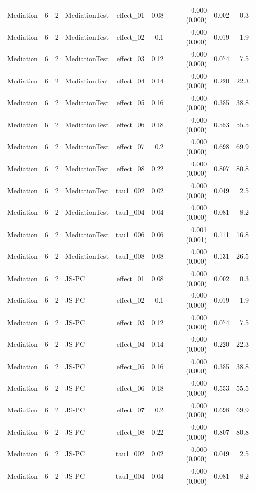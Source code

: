 \begin{longtable}{lcclrrrrr}
Mediation & 6 & 2 & MediationTest & effect\_01 & 0.08 & 0.000 (0.000) & 0.002 & 0.3\\
Mediation & 6 & 2 & MediationTest & effect\_02 & 0.1 & 0.000 (0.000) & 0.019 & 1.9\\
Mediation & 6 & 2 & MediationTest & effect\_03 & 0.12 & 0.000 (0.000) & 0.074 & 7.5\\
Mediation & 6 & 2 & MediationTest & effect\_04 & 0.14 & 0.000 (0.000) & 0.220 & 22.3\\
Mediation & 6 & 2 & MediationTest & effect\_05 & 0.16 & 0.000 (0.000) & 0.385 & 38.8\\
Mediation & 6 & 2 & MediationTest & effect\_06 & 0.18 & 0.000 (0.000) & 0.553 & 55.5\\
Mediation & 6 & 2 & MediationTest & effect\_07 & 0.2 & 0.000 (0.000) & 0.698 & 69.9\\
Mediation & 6 & 2 & MediationTest & effect\_08 & 0.22 & 0.000 (0.000) & 0.807 & 80.8\\
Mediation & 6 & 2 & MediationTest & tau1\_002 & 0.02 & 0.000 (0.000) & 0.049 & 2.5\\
Mediation & 6 & 2 & MediationTest & tau1\_004 & 0.04 & 0.000 (0.000) & 0.081 & 8.2\\
Mediation & 6 & 2 & MediationTest & tau1\_006 & 0.06 & 0.001 (0.001) & 0.111 & 16.8\\
Mediation & 6 & 2 & MediationTest & tau1\_008 & 0.08 & 0.000 (0.000) & 0.131 & 26.5\\
Mediation & 6 & 2 & JS-PC & effect\_01 & 0.08 & 0.000 (0.000) & 0.002 & 0.3\\
Mediation & 6 & 2 & JS-PC & effect\_02 & 0.1 & 0.000 (0.000) & 0.019 & 1.9\\
Mediation & 6 & 2 & JS-PC & effect\_03 & 0.12 & 0.000 (0.000) & 0.074 & 7.5\\
Mediation & 6 & 2 & JS-PC & effect\_04 & 0.14 & 0.000 (0.000) & 0.220 & 22.3\\
Mediation & 6 & 2 & JS-PC & effect\_05 & 0.16 & 0.000 (0.000) & 0.385 & 38.8\\
Mediation & 6 & 2 & JS-PC & effect\_06 & 0.18 & 0.000 (0.000) & 0.553 & 55.5\\
Mediation & 6 & 2 & JS-PC & effect\_07 & 0.2 & 0.000 (0.000) & 0.698 & 69.9\\
Mediation & 6 & 2 & JS-PC & effect\_08 & 0.22 & 0.000 (0.000) & 0.807 & 80.8\\
Mediation & 6 & 2 & JS-PC & tau1\_002 & 0.02 & 0.000 (0.000) & 0.049 & 2.5\\
Mediation & 6 & 2 & JS-PC & tau1\_004 & 0.04 & 0.000 (0.000) & 0.081 & 8.2\\

\end{longtable}
